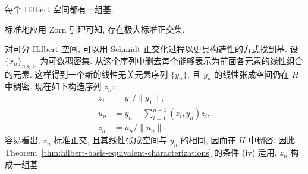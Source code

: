\begin{Corollary}
\label{cor:hilbert-basis-existence}
每个 Hilbert 空间都有一组基.
\end{Corollary}

\begin{Proof}
标准地应用 Zorn 引理可知, 存在极大标准正交集.
\end{Proof}

对可分 Hilbert 空间, 可以用 Schmidt 正交化过程以更具构造性的方式找到基. 设 $\{x_n\}_{n\in\mathbb{N}}$ 为可数稠密集. 从这个序列中删去每个能够表示为前面各元素的线性组合的元素. 这样得到一个新的线性无关元素序列 $\{y_n\}$, 且 $y_n$ 的线性张成空间仍在 $H$ 中稠密. 现在如下构造序列 $z_n$:
\begin{equation}\label{eq:schmidt-orthogonalization-recursion}
\begin{aligned}
z_1&=y_1/\|y_1\|,\\
u_n&=y_n-\sum_{i=1}^{n-1}(z_i,y_n)z_i,\\
z_n&=u_n/\|u_n\|.
\end{aligned}
\end{equation}
容易看出, $z_n$ 标准正交, 且其线性张成空间与 $y_n$ 的相同, 因而在 $H$ 中稠密. 因此 Theorem~\ref{thm:hilbert-basis-equivalent-characterizations} 的条件 (iv) 适用, $z_n$ 构成一组基.
